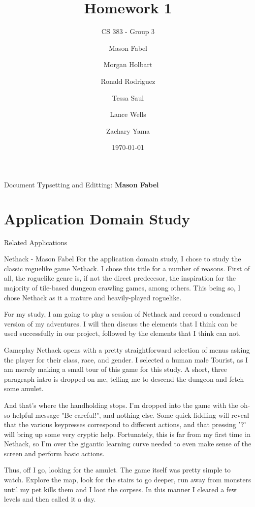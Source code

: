 \documentclass[12pt]{report}
\title{Homework 1}
\subtitle{CS 383 - Group 3}
\author{
Mason Fabel \\
\and Morgan Holbart \\
\and Ronald Rodriguez \\
\and Tessa Saul \\
\and Lance Wells \\
\and Zachary Yama \\
}
\date{\today}
\begin{document}
\maketitle

\tableofcontents
Document Typsetting and Editting: \textbf{Mason Fabel}
\clearpage

\chapter{Application Domain Study}

\begin{section}{Related Applications}

\begin{subsection}{Nethack - Mason Fabel}
For the application domain study, I chose to study the classic roguelike
game Nethack. I chose this title for a number of reasons. First of all,
the roguelike genre is, if not the direct predecesor, the inspiration for
the majority of tile-based dungeon crawling games, among others. This being
so, I chose Nethack as it a mature and heavily-played roguelike.

For my study, I am going to play a session of Nethack and record a
condensed version of my adventures. I will then discuss the elements that
I think can be used successfully in our project, followed by the elements
that I think can not.

\begin{subsubsection}{Gameplay}
Nethack opens with a pretty straightforward selection of menus asking the
player for their class, race, and gender. I selected a human male Tourist,
as I am merely making a small tour of this game for this study. A short,
three paragraph intro is dropped on me, telling me to descend the
dungeon and fetch some amulet.

And that's where the handholding stops. I'm dropped into the game with the
oh-so-helpful message "Be careful!", and nothing else. Some quick fiddling
will reveal that the various keypresses correspond to different actions,
and that pressing '?' will bring up some very cryptic help. Fortunately,
this is far from my first time in Nethack, so I'm over the gigantic
learning curve needed to even make sense of the screen and perform basic
actions.

Thus, off I go, looking for the amulet. The game itself was pretty simple
to watch. Explore the map, look for the stairs to go deeper, run away from
monsters until my pet kills them and I loot the corpses. In this manner I
cleared a few levels and then called it a day.
\end{subsubsection}


\end{subsection}
\end{section}
\end{document}
